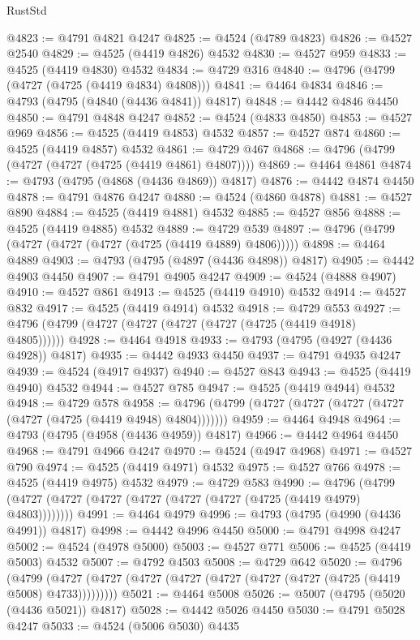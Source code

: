 \begin{lexlean}{RustStd}
\begin{coremodule}
@4823 := @4791 @4821 @4247
@4825 := @4524 (@4789 @4823)
@4826 := @4527 @2540
@4829 := @4525 (@4419 @4826) @4532
@4830 := @4527 @959
@4833 := @4525 (@4419 @4830) @4532
@4834 := @4729 @316
@4840 := @4796 (@4799 (@4727 (@4725 (@4419 @4834) @4808)))
@4841 := @4464 @4834
@4846 := @4793 (@4795 (@4840 (@4436 @4841)) @4817)
@4848 := @4442 @4846 @4450
@4850 := @4791 @4848 @4247
@4852 := @4524 (@4833 @4850)
@4853 := @4527 @969
@4856 := @4525 (@4419 @4853) @4532
@4857 := @4527 @874
@4860 := @4525 (@4419 @4857) @4532
@4861 := @4729 @467
@4868 := @4796 (@4799 (@4727 (@4727 (@4725 (@4419 @4861) @4807))))
@4869 := @4464 @4861
@4874 := @4793 (@4795 (@4868 (@4436 @4869)) @4817)
@4876 := @4442 @4874 @4450
@4878 := @4791 @4876 @4247
@4880 := @4524 (@4860 @4878)
@4881 := @4527 @890
@4884 := @4525 (@4419 @4881) @4532
@4885 := @4527 @856
@4888 := @4525 (@4419 @4885) @4532
@4889 := @4729 @539
@4897 := @4796 (@4799 (@4727 (@4727 (@4727 (@4725 (@4419 @4889) @4806)))))
@4898 := @4464 @4889
@4903 := @4793 (@4795 (@4897 (@4436 @4898)) @4817)
@4905 := @4442 @4903 @4450
@4907 := @4791 @4905 @4247
@4909 := @4524 (@4888 @4907)
@4910 := @4527 @861
@4913 := @4525 (@4419 @4910) @4532
@4914 := @4527 @832
@4917 := @4525 (@4419 @4914) @4532
@4918 := @4729 @553
@4927 := @4796 (@4799 (@4727 (@4727 (@4727 (@4727 (@4725 (@4419 @4918) @4805))))))
@4928 := @4464 @4918
@4933 := @4793 (@4795 (@4927 (@4436 @4928)) @4817)
@4935 := @4442 @4933 @4450
@4937 := @4791 @4935 @4247
@4939 := @4524 (@4917 @4937)
@4940 := @4527 @843
@4943 := @4525 (@4419 @4940) @4532
@4944 := @4527 @785
@4947 := @4525 (@4419 @4944) @4532
@4948 := @4729 @578
@4958 := @4796 (@4799 (@4727 (@4727 (@4727 (@4727 (@4727 (@4725 (@4419 @4948) @4804)))))))
@4959 := @4464 @4948
@4964 := @4793 (@4795 (@4958 (@4436 @4959)) @4817)
@4966 := @4442 @4964 @4450
@4968 := @4791 @4966 @4247
@4970 := @4524 (@4947 @4968)
@4971 := @4527 @790
@4974 := @4525 (@4419 @4971) @4532
@4975 := @4527 @766
@4978 := @4525 (@4419 @4975) @4532
@4979 := @4729 @583
@4990 := @4796 (@4799 (@4727 (@4727 (@4727 (@4727 (@4727 (@4727 (@4725 (@4419 @4979) @4803))))))))
@4991 := @4464 @4979
@4996 := @4793 (@4795 (@4990 (@4436 @4991)) @4817)
@4998 := @4442 @4996 @4450
@5000 := @4791 @4998 @4247
@5002 := @4524 (@4978 @5000)
@5003 := @4527 @771
@5006 := @4525 (@4419 @5003) @4532
@5007 := @4792 @4503
@5008 := @4729 @642
@5020 := @4796
    (@4799 (@4727 (@4727 (@4727 (@4727 (@4727 (@4727 (@4727 (@4725 (@4419 @5008) @4733)))))))))
@5021 := @4464 @5008
@5026 := @5007 (@4795 (@5020 (@4436 @5021)) @4817)
@5028 := @4442 @5026 @4450
@5030 := @4791 @5028 @4247
@5033 := @4524 (@5006 @5030) @4435

\end{coremodule}
\end{lexlean}
